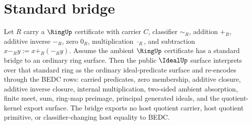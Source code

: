 \section{Standard bridge}
\label{sec:ideal-quotient-kernel-standard-bridge}

\begin{theorem}
\label{thm:ideal-public-surface-standard-bridge}
Let $R$ carry a $\RingUp$ certificate with carrier $C$, classifier $\sim_R$, addition $+_R$, additive inverse $-_R$, zero $0_R$, multiplication $\cdot_R$, and subtraction $x-_R y:=x+_R(-_R y)$. Assume the ambient $\RingUp$ certificate has a standard bridge to an ordinary ring surface. Then the public $\IdealUp$ surface interprets over that standard ring as the ordinary ideal-predicate surface and re-encodes through the BEDC rows: carried predicates, zero membership, additive closure, additive inverse closure, internal multiplication, two-sided ambient absorption, finite meet, sum, ring-map preimage, principal generated ideals, and the quotient-kernel export surface. The bridge exports no host quotient carrier, host quotient primitive, or classifier-changing host equality to BEDC.
\end{theorem}
